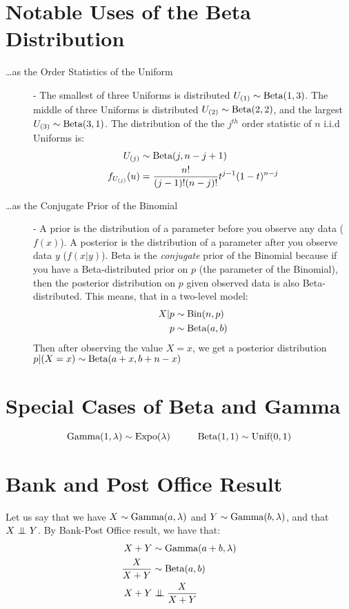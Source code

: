 \documentclass[11.5pt]{article}
\begin{document}
\begin{notes}
\section*{Notable Uses of the Beta Distribution}
\begin{description}
	\item[\dots as the Order Statistics of the Uniform] -  The smallest of three Uniforms is distributed $U_{(1)} \sim \textrm{Beta}(1, 3)$. The middle of three Uniforms is distributed $U_{(2)} \sim \textrm{Beta}(2, 2)$, and the largest $U_{(3)} \sim \textrm{Beta}(3, 1)$. The distribution of the the $j^{th}$ order statistic of $n$ i.i.d Uniforms is:
	\begin{align*}
		U_{(j)} &\sim \textrm{Beta}(j, n - j + 1) \\
		f_{U_{(j)}}(u) &= \frac{n!}{(j-1)!(n-j)!}t^{j-1}(1-t)^{n-j}
	\end{align*}
	
	
	\item[\dots as the Conjugate Prior of the Binomial] - A prior is the distribution of a parameter before you observe any data ($f(x)$). A posterior is the distribution of a parameter after you observe data $y$ ($f(x|y)$). Beta is the \emph{conjugate} prior of the Binomial because if you have a Beta-distributed prior on $p$ (the parameter of the Binomial), then the posterior distribution on $p$ given observed data is also Beta-distributed. This means, that in a two-level model:
	\begin{align*}
		X|p &\sim \textrm{Bin}(n, p) \\
		p &\sim \textrm{Beta}(a, b)
	\end{align*}
Then after observing the value $X = x$, we get a posterior distribution $p|(X=x) \sim \textrm{Beta}(a + x, b + n - x)$
\end{description}

\newpage

\section*{Special Cases of Beta and Gamma}
\[\textrm{Gamma}(1, \lambda) \sim \textrm{Expo}(\lambda) \hspace{1 cm} \textrm{Beta}(1, 1) \sim \textrm{Unif}(0, 1)\]

\section*{Bank and Post Office Result}
Let us say that we have $X \sim \textrm{Gamma}(a, \lambda)$ and $Y \sim \textrm{Gamma}(b, \lambda)$, and that $X \independent Y$. By Bank-Post Office result, we have that:
\begin{align*}
	X + Y &\sim \Gam(a + b, \lambda)\\
	\frac{X}{X + Y} &\sim \Beta(a, b)\\
	X + Y &\independent \frac{X}{X + Y}
\end{align*}




\end{notes}
\end{document}
